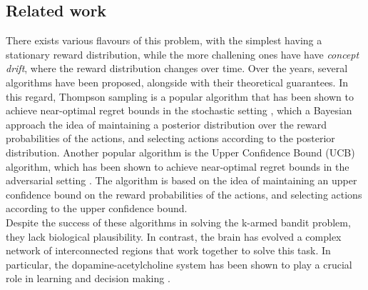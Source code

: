 \subsection{Related work}
There exists various flavours of this problem, with the simplest having a stationary reward distribution, while the more challening ones have have \textit{concept drift}, where the reward distribution changes over time.
Over the years, several algorithms have been proposed, alongside with their theoretical guarantees. In this regard, Thompson sampling is a popular algorithm that has been shown to achieve near-optimal regret bounds in the stochastic setting \cite{agrawalAnalysisThompsonSampling2012}, which 
a Bayesian approach  the idea of maintaining a posterior distribution over the reward probabilities of the actions, and selecting actions according to the posterior distribution. Another popular algorithm is the Upper Confidence Bound (UCB) algorithm, which has been shown to achieve near-optimal
regret bounds in the adversarial setting \cite{auerFinitetimeAnalysisMultiarmed2002}. The algorithm is based on the idea of maintaining an upper confidence bound on the reward probabilities of the actions, and selecting actions according to the upper confidence bound.
\\
Despite the success of these algorithms in solving the k-armed bandit problem, they lack biological plausibility. In contrast, the brain has evolved a complex network of interconnected regions that work together to solve this task. In particular, the dopamine-acetylcholine system has been shown to
play a crucial role in learning and decision making \cite{dayanDecisionTheoryReinforcement2008}.

